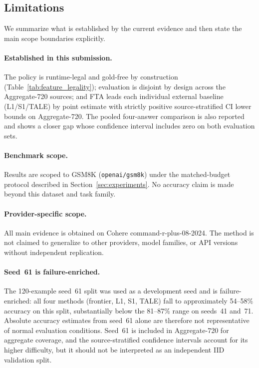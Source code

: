 \subsection{Limitations}
\label{sec:limitations}

We summarize what is established by the current evidence and then state the
main scope boundaries explicitly.

\paragraph{Established in this submission.}
The policy is runtime-legal and gold-free by construction
(Table~\ref{tab:feature_legality}); evaluation is disjoint by design across
the Aggregate-720 sources; and FTA leads each individual external baseline
(L1/S1/TALE) by point estimate with strictly positive source-stratified CI
lower bounds on Aggregate-720.
The pooled four-answer comparison is also reported and shows a closer gap
whose confidence interval includes zero on both evaluation sets.

\paragraph{Benchmark scope.}
Results are scoped to GSM8K (\texttt{openai/gsm8k}) under the matched-budget
protocol described in Section~\ref{sec:experiments}.
No accuracy claim is made beyond this dataset and task family.

\paragraph{Provider-specific scope.}
All main evidence is obtained on Cohere command-r-plus-08-2024.
The method is not claimed to generalize to other providers, model families,
or API versions without independent replication.

\paragraph{Seed~61 is failure-enriched.}
The 120-example seed~61 split was used as a development seed and is
failure-enriched: all four methods (frontier, L1, S1, TALE) fall to
approximately 54--58\% accuracy on this split, substantially below the
81--87\% range on seeds~41 and~71.
Absolute accuracy estimates from seed~61 alone are therefore not
representative of normal evaluation conditions.
Seed~61 is included in Aggregate-720 for aggregate coverage, and the
source-stratified confidence intervals account for its higher difficulty,
but it should not be interpreted as an independent IID validation split.

